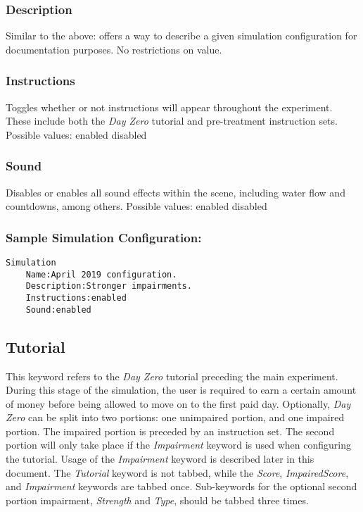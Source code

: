 \documentclass{article}
\begin{document}
\subsubsection*{Description} Similar to the above: offers a way to describe a given simulation configuration for documentation purposes. No restrictions on value. 
\pagebreak\subsubsection*{Instructions} Toggles whether or not instructions will appear throughout the experiment. These include both the \textit{Day Zero} tutorial and pre-treatment instruction sets.
\newline \indent Possible values: \newline
\indent\indent enabled \newline
\indent\indent disabled

\subsubsection*{Sound} Disables or enables all sound effects within the scene, including water flow and countdowns, among others.
\newline \indent Possible values: \newline
\indent\indent enabled \newline
\indent\indent disabled

\subsubsection*{Sample Simulation Configuration:}
\begin{lstlisting}
Simulation
    Name:April 2019 configuration.
    Description:Stronger impairments.
    Instructions:enabled
    Sound:enabled
\end{lstlisting} 

\subsection*{Tutorial}
This keyword refers to the \textit{Day Zero} tutorial preceding the main experiment. During this stage of the simulation, the user is required to earn a certain amount of money before being allowed to move on to the first paid day. Optionally, \textit{Day Zero} can be split into two portions: one unimpaired portion, and one impaired portion. The impaired portion is preceded by an instruction set. The second portion will only take place if the \textit{Impairment} keyword is used when configuring the tutorial. Usage of the \textit{Impairment} keyword is described later in this document. The \textit{Tutorial} keyword is not tabbed, while the \textit{Score}, \textit{ImpairedScore}, and \textit{Impairment} keywords are tabbed once. Sub-keywords for the optional second portion impairment, \textit{Strength} and \textit{Type}, should be tabbed three times.
\end{document}
